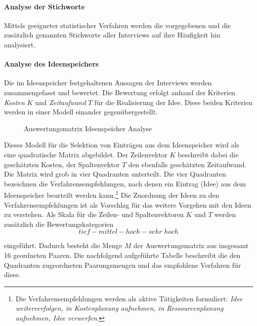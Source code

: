 \documentclass[../../main.tex]{subfiles}
\begin{document}
\paragraph*{Analyse der Stichworte}\mbox{}


\begin{sloppypar}
Mittels geeigneter statistischer Verfahren werden die vorgegebenen und die zusätzlich genannten Stichworte aller Interviews auf ihre Häufigkeit hin analysiert.
\end{sloppypar}

\paragraph*{Analyse des Ideenspeichers}\mbox{}

\begin{sloppypar}
Die im Ideenspeicher festgehaltenen Aussagen der Interviews werden zusammengefasst und bewertet. Die Bewertung erfolgt anhand der Kriterien \textit{Kosten} $K$ und \textit{Zeitaufwand} $T$ für die Realisierung der Idee. Diese beiden Kriterien werden in einer Modell einander gegenübergestellt.
\end{sloppypar}

\begin{figure}[H]
 \centering
    
 \caption{Auswertungsmatrix Ideenspeicher Analyse}
 \label{Auswertungsmatrix Ideenspeicher-Analyse}
\end{figure}

\begin{sloppypar}
Dieses Modell für die Selektion von Einträgen aus dem Ideenspeicher wird als eine quadratische Matrix abgebildet. Der Zeilenvektor $K$ beschreibt dabei die geschätzten Kosten, der Spaltenvektor $T$ den ebenfalls geschätzten Zeitaufwand. Die Matrix wird grob in vier Quadranten unterteilt. Die vier Quadranten bezeichnen die Verfahrensempfehlungen, nach denen ein Eintrag (Idee) aus dem Ideenspeicher beurteilt werden kann.\footnote{Die Verfahrensempfehlungen werden als aktive Tätigkeiten formuliert: \textit{Idee weiterverfolgen, in Kostenplanung aufnehmen, in Ressourcenplanung aufnehmen, Idee verwerfen}.} Die Zuordnung der Ideen zu den Verfahrensempfehlungen ist als Vorschlag für das weitere Vorgehen mit den Ideen zu verstehen. Als Skala für die Zeilen- und Spaltenvektoren $K$ und $T$ werden zusätzlich die Bewertungskategorien 
\[tief - mittel - hoch - sehr \; hoch\]

eingeführt. Dadurch besteht die Menge $M$ der Auswertungsmatrix aus insgesamt 16 geordneten Paaren. Die nachfolgend aufgeführte Tabelle beschreibt die den Quadranten zugeordneten Paarungsmengen und das empfohlene Verfahren für diese.
\end{sloppypar}
\end{document}
